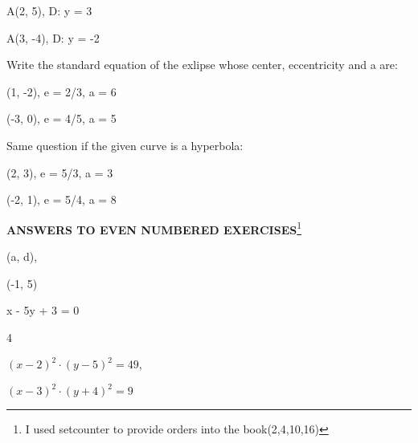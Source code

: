 \documentclass[11pt]{amsbook}
\begin{document}
\begin{hEnumerateArabic}
\begin{hEnumerateAlpha}
			\begin{multicols}{2}
				\item A(2, 5), \: D: y = 3
			\columnbreak
				\item A(3, -4), \: D: y = -2
			\end{multicols}
		\end{hEnumerateAlpha}
	\item Write the standard equation of the exlipse whose center, eccentricity and a are:
		\begin{hEnumerateAlpha}
			\begin{multicols}{2}
				\item (1, -2), \: e = 2/3, \: a = 6
			\columnbreak
				\item (-3, 0), \: e = 4/5, \: a = 5
			\end{multicols}	
		\end{hEnumerateAlpha}
	\item Same question if the given curve is a hyperbola:
		\begin{hEnumerateAlpha}
			\begin{multicols}{2}
				\item (2, 3), \: e = 5/3, \: a = 3
			\columnbreak
				\item (-2, 1), \: e = 5/4, \: a = 8\\  
			\end{multicols}
		\end{hEnumerateAlpha}
\end{hEnumerateArabic}

\centerline{\textbf{ANSWERS TO EVEN NUMBERED EXERCISES}\footnote{I used setcounter to provide orders into the book(2,4,10,16)}} 


\begin{hEnumerateArabic}
	\setcounter{enumi}{1}
	\item
		\begin{hEnumerateAlpha}
			\begin{multicols}{2}
				\item (a, d),
			\columnbreak
				\item (-1, 5)
			\end{multicols}
		\end{hEnumerateAlpha}
	\setcounter{enumi}{3}
	\item x - 5y + 3 = 0\\
	\setcounter{enumi}{9}
	\item 4
	\setcounter{enumi}{15}
	\item
	\begin{hEnumerateAlpha}
		\begin{multicols}{2}
			\item  $(x-2)^2 \cdot (y-5)^2 = 49$,
		\columnbreak
			\item $(x - 3)^2 \cdot (y + 4)^2 = 9$\\
		\end{multicols}
	\end{hEnumerateAlpha}
\end{hEnumerateArabic}
\end{document}
